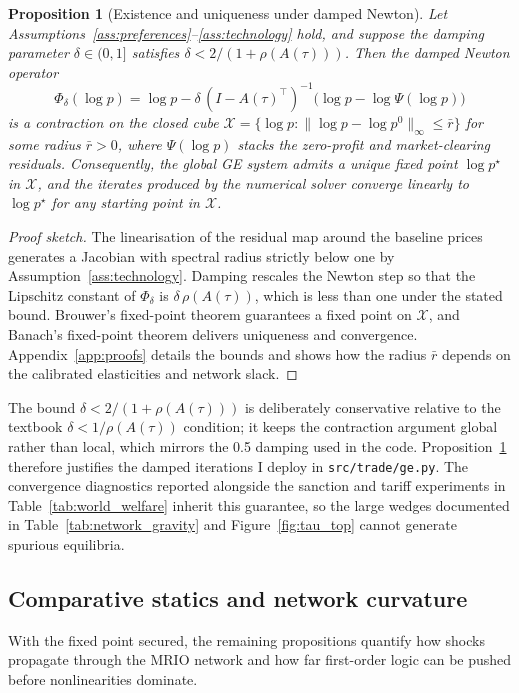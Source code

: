 \documentclass[12pt]{article}
\newtheorem{proposition}{Proposition}
\begin{document}
\begin{proposition}[Existence and uniqueness under damped Newton]\label{prop:existence}
Let Assumptions~\ref{ass:preferences}--\ref{ass:technology} hold, and suppose the damping parameter $\delta \in (0,1]$ satisfies $\delta < 2/(1+\rho(A(\tau)))$. Then the damped Newton operator
\begin{equation}
    \Phi_{\delta}(\log p) = \log p - \delta\,(I - A(\tau)^{\top})^{-1}\bigl(\log p - \log \Psi(\log p)\bigr)
\end{equation}
is a contraction on the closed cube $\mathcal{X} = \{\log p : \|\log p - \log p^0\|_{\infty} \leq \bar{r}\}$ for some radius $\bar{r}>0$, where $\Psi(\log p)$ stacks the zero-profit and market-clearing residuals. Consequently, the global GE system admits a unique fixed point $\log p^{\star}$ in $\mathcal{X}$, and the iterates produced by the numerical solver converge linearly to $\log p^{\star}$ for any starting point in $\mathcal{X}$.
\end{proposition}

\begin{proof}[Proof sketch]
The linearisation of the residual map around the baseline prices generates a Jacobian with spectral radius strictly below one by Assumption~\ref{ass:technology}. Damping rescales the Newton step so that the Lipschitz constant of $\Phi_{\delta}$ is $\delta\,\rho(A(\tau))$, which is less than one under the stated bound. Brouwer's fixed-point theorem guarantees a fixed point on $\mathcal{X}$, and Banach's fixed-point theorem delivers uniqueness and convergence. Appendix~\ref{app:proofs} details the bounds and shows how the radius $\bar{r}$ depends on the calibrated elasticities and network slack.
\end{proof}

The bound $\delta < 2/(1+\rho(A(\tau)))$ is deliberately conservative relative to the textbook $\delta < 1/\rho(A(\tau))$ condition; it keeps the contraction argument global rather than local, which mirrors the 0.5 damping used in the code. Proposition~\ref{prop:existence} therefore justifies the damped iterations I deploy in \texttt{src/trade/ge.py}. The convergence diagnostics reported alongside the sanction and tariff experiments in Table~\ref{tab:world_welfare} inherit this guarantee, so the large wedges documented in Table~\ref{tab:network_gravity} and Figure~\ref{fig:tau_top} cannot generate spurious equilibria.

\subsection{Comparative statics and network curvature}
With the fixed point secured, the remaining propositions quantify how shocks propagate through the MRIO network and how far first-order logic can be pushed before nonlinearities dominate.
\end{document}
